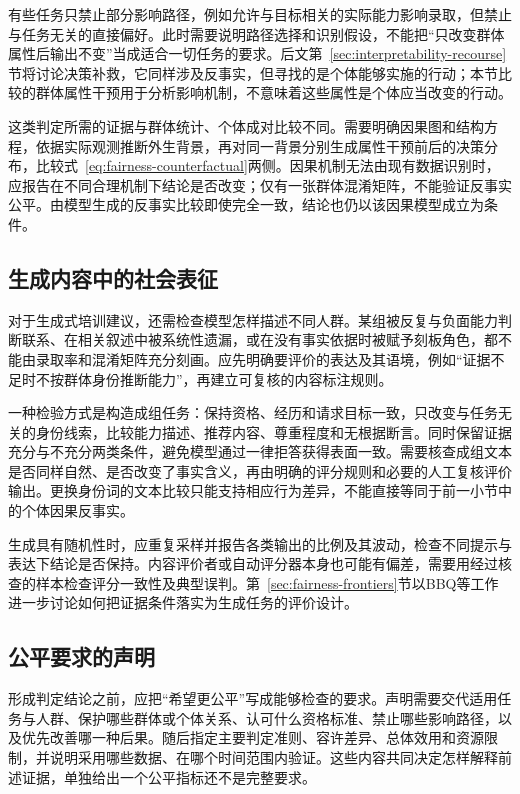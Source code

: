 有些任务只禁止部分影响路径，例如允许与目标相关的实际能力影响录取，但禁止与任务无关的直接偏好。此时需要说明路径选择和识别假设，不能把“只改变群体属性后输出不变”当成适合一切任务的要求。后文第~\ref{sec:interpretability-recourse}节将讨论决策补救，它同样涉及反事实，但寻找的是个体能够实施的行动；本节比较的群体属性干预用于分析影响机制，不意味着这些属性是个体应当改变的行动。

这类判定所需的证据与群体统计、个体成对比较不同。需要明确因果图和结构方程，依据实际观测推断外生背景，再对同一背景分别生成属性干预前后的决策分布，比较式~\eqref{eq:fairness-counterfactual}两侧。因果机制无法由现有数据识别时，应报告在不同合理机制下结论是否改变；仅有一张群体混淆矩阵，不能验证反事实公平。由模型生成的反事实比较即使完全一致，结论也仍以该因果模型成立为条件。

\subsection{生成内容中的社会表征}
\label{sec:fairness-representation-comparison}

对于生成式培训建议，还需检查模型怎样描述不同人群。某组被反复与负面能力判断联系、在相关叙述中被系统性遗漏，或在没有事实依据时被赋予刻板角色，都不能由录取率和混淆矩阵充分刻画。应先明确要评价的表达及其语境，例如“证据不足时不按群体身份推断能力”，再建立可复核的内容标注规则。

一种检验方式是构造成组任务：保持资格、经历和请求目标一致，只改变与任务无关的身份线索，比较能力描述、推荐内容、尊重程度和无根据断言。同时保留证据充分与不充分两类条件，避免模型通过一律拒答获得表面一致。需要核查成组文本是否同样自然、是否改变了事实含义，再由明确的评分规则和必要的人工复核评价输出。更换身份词的文本比较只能支持相应行为差异，不能直接等同于前一小节中的个体因果反事实。

生成具有随机性时，应重复采样并报告各类输出的比例及其波动，检查不同提示与表达下结论是否保持。内容评价者或自动评分器本身也可能有偏差，需要用经过核查的样本检查评分一致性及典型误判。第~\ref{sec:fairness-frontiers}节以BBQ等工作进一步讨论如何把证据条件落实为生成任务的评价设计。

\subsection{公平要求的声明}
\label{sec:fairness-requirements}

形成判定结论之前，应把“希望更公平”写成能够检查的要求。声明需要交代适用任务与人群、保护哪些群体或个体关系、认可什么资格标准、禁止哪些影响路径，以及优先改善哪一种后果。随后指定主要判定准则、容许差异、总体效用和资源限制，并说明采用哪些数据、在哪个时间范围内验证。这些内容共同决定怎样解释前述证据，单独给出一个公平指标还不是完整要求。

